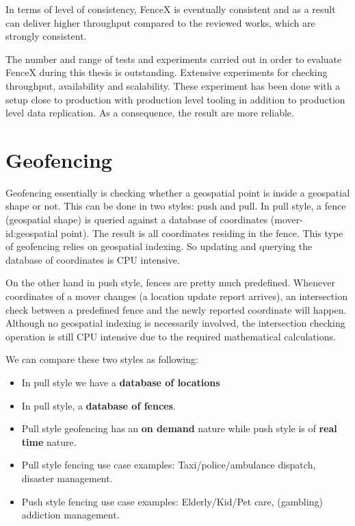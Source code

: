 \documentclass[a4]{report}
\begin{document}
    In terms of level of consistency, FenceX is eventually consistent and as a result can deliver higher throughput
    compared to the reviewed works, which are strongly consistent.

    The number and range of tests and experiments carried out in order to evaluate FenceX during this thesis is
    outstanding.
    Extensive experiments for checking throughput, availability and scalability.
    These experiment has been done with a setup close to production with production level tooling in addition to
    production level data replication.
    As a consequence, the result are more reliable.


    \chapter{Geofencing}
    Geofencing essentially is checking whether a geospatial point is inside a geospatial shape or not.
    This can be done in two styles: push and pull.
    In pull style, a fence (geospatial shape) is queried against a database of coordinates (mover-id:geospatial point).
    The result is all coordinates residing in the fence.
    This type of geofencing relies on geospatial indexing.
    So updating and querying the database of coordinates is CPU intensive.

    On the other hand in push style, fences are pretty much predefined.
    Whenever coordinates of a mover changes (a location update report arrives), an intersection check between a
    predefined fence and the newly reported coordinate will happen.
    Although no geospatial indexing is necessarily involved, the intersection checking operation is still CPU
    intensive due to the required mathematical calculations.

    We can compare these two styles as following:
    \begin{itemize}
        \item In pull style we have a \textbf{database of locations}
        \item In pull style, a \textbf{database of fences}.
        \item Pull style geofencing has an \textbf{on demand} nature while push style is of \textbf{real time} nature.
        \item Pull style fencing use case examples: Taxi/police/ambulance dispatch, disaster management.
        \item Push style fencing use case examples: Elderly/Kid/Pet care, (gambling) addiction management.
    \end{itemize}
\end{document}
